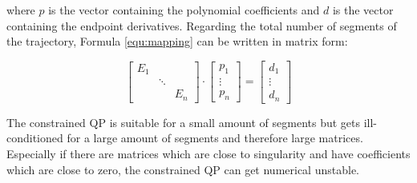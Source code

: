 where $p$ is the vector containing the polynomial coefficients and $d$ is the vector containing the endpoint derivatives. Regarding the total number of segments of the trajectory, Formula \ref{equ:mapping} can be written in matrix form:

\begin{equation}
\begin{bmatrix}
   E_1 &  &  \\
    & \ddots &  \\
   & & E_n
\end{bmatrix} 
\cdot
\begin{bmatrix}
   p_1 \\
\vdots \\
  p_n
\end{bmatrix}
=
\begin{bmatrix}
   d_1 \\
\vdots \\
  d_n
\end{bmatrix}
\end{equation} 

The constrained QP is suitable for a small amount of segments but gets ill-conditioned for a large amount of segments and therefore large matrices. Especially if there are matrices which are close to singularity and have coefficients which are close to zero, the constrained QP can get numerical unstable.










